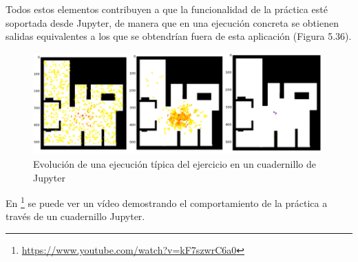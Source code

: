 Todos estos elementos contribuyen a que la funcionalidad de la práctica esté soportada desde Jupyter, de manera que en una ejecución concreta se obtienen salidas equivalentes a los que se obtendrían fuera de esta aplicación (Figura 5.36).

\begin{figure}[H]
	\begin{center}
		\includegraphics[width=0.99\textwidth]{figures/outputjupyterll.png}
		\caption{Evolución de una ejecución típica del ejercicio en un cuadernillo de Jupyter}
		\label{fig.laserjupyter}
	\end{center}
\end{figure}

En \footnote{\url{https://www.youtube.com/watch?v=kF7szwrC6a0}} se puede ver un vídeo demostrando el comportamiento de la práctica a través de un cuadernillo Jupyter.